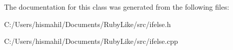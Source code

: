 The documentation for this class was generated from the following files\-:\begin{DoxyCompactItemize}
\item 
C\-:/\-Users/hismahil/\-Documents/\-Ruby\-Like/src/ifelse.\-h\item 
C\-:/\-Users/hismahil/\-Documents/\-Ruby\-Like/src/ifelse.\-cpp\end{DoxyCompactItemize}
